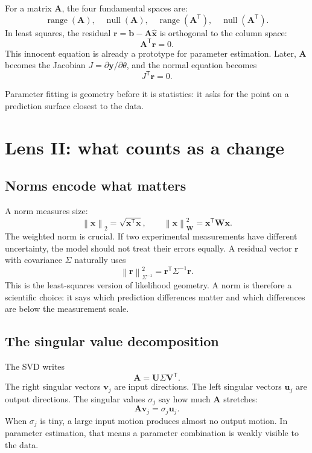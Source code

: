 \documentclass[a4paper]{article}
\DeclareMathOperator{\range}{range}
\DeclareMathOperator{\nullsp}{null}
\newcommand{\mat}[1]{\mathbf{#1}}
\newcommand{\vect}[1]{\mathbf{#1}}
\newcommand{\param}{\theta}
\newcommand{\norm}[1]{\left\lVert #1\right\rVert}
\newcommand{\transpose}{\mathsf{T}}
\newcommand{\jac}{J}
\begin{document}
For a matrix \(\mat{A}\), the four fundamental spaces are:
\[
  \range(\mat{A}),\quad
  \nullsp(\mat{A}),\quad
  \range(\mat{A}^{\transpose}),\quad
  \nullsp(\mat{A}^{\transpose}).
\]
In least squares, the residual \(\vect{r}=\vect{b}-\mat{A}\widehat{\vect{x}}\) is orthogonal to the column space:
\[
  \mat{A}^{\transpose}\vect{r}=0.
\]
This innocent equation is already a prototype for parameter estimation.  Later, \(\mat{A}\) becomes the Jacobian \(\jac=\partial \vect{y}/\partial\param\), and the normal equation becomes
\[
  \jac^{\transpose}\vect{r}=0.
\]

\begin{remark}
  Parameter fitting is geometry before it is statistics: it asks for the point on a prediction surface closest to the data.
\end{remark}

\section{Lens II: what counts as a change}

\subsection{Norms encode what matters}

A norm measures size:
\[
  \norm{\vect{x}}_2=\sqrt{\vect{x}^{\transpose}\vect{x}},
  \qquad
  \norm{\vect{x}}_{\mat{W}}^2=\vect{x}^{\transpose}\mat{W}\vect{x}.
\]
The weighted norm is crucial.  If two experimental measurements have different uncertainty, the model should not treat their errors equally.  A residual vector \(\vect{r}\) with covariance \(\Sigma\) naturally uses
\[
  \norm{\vect{r}}_{\Sigma^{-1}}^2
  =
  \vect{r}^{\transpose}\Sigma^{-1}\vect{r}.
\]
This is the least-squares version of likelihood geometry.  A norm is therefore a scientific choice: it says which prediction differences matter and which differences are below the measurement scale.

\subsection{The singular value decomposition}

The SVD writes
\[
  \mat{A}
  =
  \mat{U}\Sigma\mat{V}^{\transpose}.
\]
The right singular vectors \(\vect{v}_j\) are input directions.  The left singular vectors \(\vect{u}_j\) are output directions.  The singular values \(\sigma_j\) say how much \(\mat{A}\) stretches:
\[
  \mat{A}\vect{v}_j=\sigma_j\vect{u}_j.
\]
When \(\sigma_j\) is tiny, a large input motion produces almost no output motion.  In parameter estimation, that means a parameter combination is weakly visible to the data.
\end{document}
